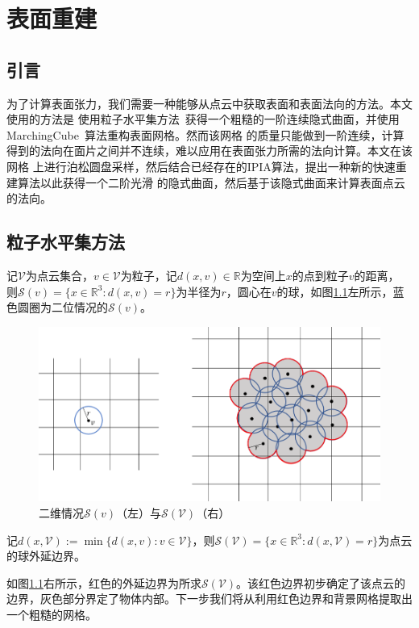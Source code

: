 \chapter{表面重建} \label{chap3}
\section{引言}
为了计算表面张力，我们需要一种能够从点云中获取表面和表面法向的方法。本文使用的方法是
使用粒子水平集方法~\cite{boyd2012multiflip}获得一个粗糙的一阶连续隐式曲面，并使用MarchingCube~\cite{heiden1993fast}算法重构表面网格。然而该网格
的质量只能做到一阶连续，计算得到的法向在面片之间并不连续，难以应用在表面张力所需的法向计算。本文在该网格
上进行泊松圆盘采样，然后结合已经存在的IPIA算法，提出一种新的快速重建算法以此获得一个二阶光滑
的隐式曲面，然后基于该隐式曲面来计算表面点云的法向。
\section{粒子水平集方法}
记$\mathcal{V}$为点云集合，$v\in \mathcal{V}$为粒子，记$d(x,v)\in \mathbb{R}$为空间上$x$的点到粒子$v$的距离，
则$\mathcal{S}(v) = \{x\in \mathbb{R}^3: d(x,v) = r\}$为半径为$r$，圆心在$v$的球，如图\ref{fig:particle levelset}左所示，蓝色圆圈为二位情况的$\mathcal{S}(v)$。
\begin{figure}[htbp]
    \centering
    \includegraphics[scale=1.0]{./images/image3.png}
    \caption{二维情况$\mathcal{S}(v)$（左）与$\mathcal{S}(\mathcal{V})$（右）}
    \label{fig:particle levelset}
\end{figure}

记$d(x,\mathcal{V}):= \min \{ d(x,v): v\in \mathcal{V}\}$，则$\mathcal{S}(\mathcal{V}) = \{x\in \mathbb{R}^3: d(x,\mathcal{V}) = r\}$为点云的球外延边界。

如图\ref{fig:particle levelset}右所示，红色的外延边界为所求$\mathcal{S}(\mathcal{V})$。该红色边界初步确定了该点云的边界，灰色部分界定了物体内部。下一步我们将从利用红色边界和背景网格提取出
一个粗糙的网格。

